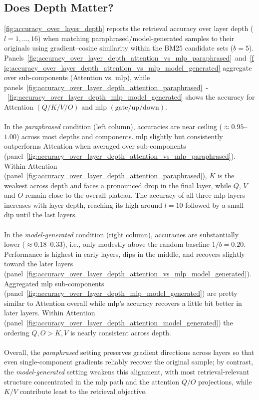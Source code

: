 \subsection{Does Depth Matter?}
\autoref{fig:accuracy_over_layer_depth} reports the retrieval accuracy over layer depth ($l=1,\ldots,16$) when matching paraphrased/model-generated samples to their originals using gradient–cosine similarity within the BM25 candidate sets ($b{=}5$). Panels~\ref{fig:accuracy_over_layer_depth_attention_vs_mlp_paraphrased}~and~\ref{fig:accuracy_over_layer_depth_attention_vs_mlp_model_generated} aggregate over sub-components (Attention vs. \acrshort{mlp}), while panels~\ref{fig:accuracy_over_layer_depth_attention_paraphrased}~-~\ref{fig:accuracy_over_layer_depth_mlp_model_generated} shows the accuracy for Attention $(Q/K/V/O)$ and \acrshort{mlp} $(\text{gate}/\text{up}/\text{down})$.
\\\\
In the \emph{paraphrased} condition (left column), accuracies are near ceiling ($\approx0.95$–$1.00$) across most depths and components. \acrshort{mlp} slightly but consistently outperforms Attention when averaged over sub-components (panel~\ref{fig:accuracy_over_layer_depth_attention_vs_mlp_paraphrased}). Within Attention (panel~\ref{fig:accuracy_over_layer_depth_attention_paraphrased}), $K$ is the weakest across depth and faces a pronounced drop in the final layer, while $Q$, $V$ and $O$ remain close to the overall plateau. The accuracy of all three \acrshort{mlp} layers increases with layer depth, reaching its high around $l=10$ followed by a small dip until the last layers.
\\\\
In the \emph{model-generated} condition (right column), accuracies are substantially lower ($\approx0.18$–$0.33$), i.e., only modestly above the random baseline $1/b=0.20$. Performance is highest in early layers, dips in the middle, and recovers slightly toward the later layers (panel~\ref{fig:accuracy_over_layer_depth_attention_vs_mlp_model_generated}). Aggregated \acrshort{mlp} sub-components (panel~\ref{fig:accuracy_over_layer_depth_mlp_model_generated}) are pretty similar to Attention overall while \acrshort{mlp}'s accuracy recovers a little bit better in later layers. Within Attention (panel~\ref{fig:accuracy_over_layer_depth_attention_model_generated}) the ordering $Q,O > K,V$ is nearly consistent across depth.
\\\\
Overall, the \emph{paraphrased} setting preserves gradient directions across layers so that even single-component gradients reliably recover the original sample; by contrast, the \emph{model-generated} setting weakens this alignment, with most retrieval-relevant structure concentrated in the \acrshort{mlp} path and the attention $Q/O$ projections, while $K/V$ contribute least to the retrieval objective.
